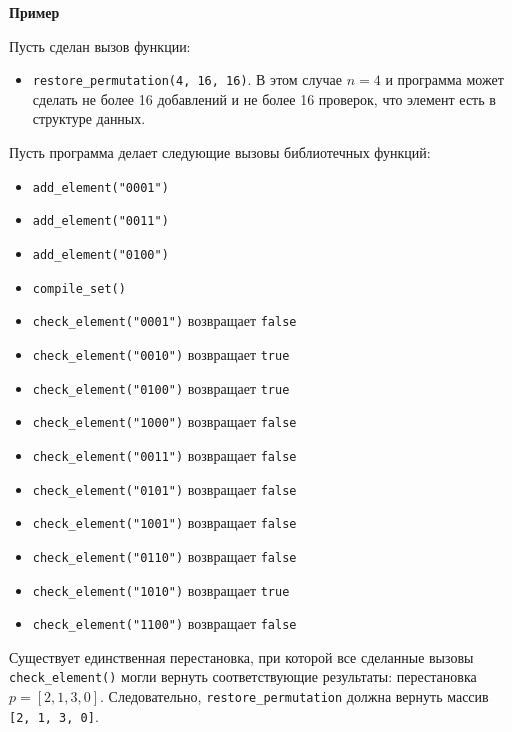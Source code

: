 \textbf{Пример}

Пусть сделан вызов функции:

\begin{itemize}
\item \texttt{restore\_permutation(4, 16, 16)}. В этом случае $n = 4$ и программа может сделать не более 16 добавлений и не более 16 проверок, что элемент есть в структуре данных.
\end{itemize}


Пусть программа делает следующие вызовы библиотечных функций:

\begin{itemize}
\item \texttt{add\_element("0001")}
\item \texttt{add\_element("0011")}
\item \texttt{add\_element("0100")}
\item \texttt{compile\_set()}
\item \texttt{check\_element("0001")} возвращает \texttt{false}
\item \texttt{check\_element("0010")} возвращает \texttt{true}
\item \texttt{check\_element("0100")} возвращает \texttt{true}
\item \texttt{check\_element("1000")} возвращает \texttt{false}
\item \texttt{check\_element("0011")} возвращает \texttt{false}
\item \texttt{check\_element("0101")} возвращает \texttt{false}
\item \texttt{check\_element("1001")} возвращает \texttt{false}
\item \texttt{check\_element("0110")} возвращает \texttt{false}
\item \texttt{check\_element("1010")} возвращает \texttt{true}
\item \texttt{check\_element("1100")} возвращает \texttt{false}
 \end{itemize}

Существует единственная перестановка, при которой все сделанные вызовы \texttt{check\_element()} могли вернуть соответствующие результаты: перестановка 
$p = [2, 1, 3, 0]$. Следовательно, \texttt{restore\_permutation} должна вернуть массив \texttt{[2, 1, 3, 0]}.

